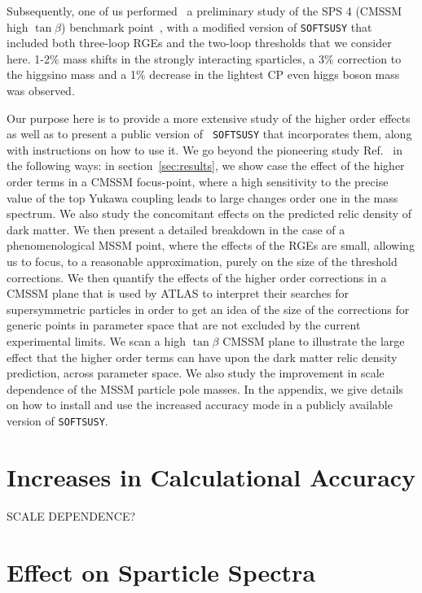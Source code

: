 \documentclass[final,3p,times,pdflatex]{elsarticle}
\begin{document}
Subsequently, one of us performed~\cite{Bednyakov:2010ni} a preliminary study
of the SPS 4 (CMSSM high
$\tan \beta$) benchmark
point~\cite{Allanach:2002nj}, with a modified version of {\tt SOFTSUSY} that
included both three-loop RGEs and the two-loop thresholds that we consider
here. 1-2$\%$ mass shifts in the strongly interacting sparticles, a 3$\%$
correction to the higgsino mass and a 1$\%$ decrease in the lightest CP even
higgs boson mass was observed. 

Our purpose here is to provide a more extensive
study of the higher order effects as well as to present a public version of {\tt
  SOFTSUSY} that incorporates them, along with instructions on how to use it.
We go beyond the pioneering study Ref.~\cite{Bednyakov:2010ni} in the
following ways: in section~\ref{sec:results}, we show case the effect of the
higher order terms in a CMSSM  
focus-point, where a high sensitivity to the precise value of the top Yukawa
coupling leads to large changes order one in the mass spectrum. 
We also study the concomitant effects on the predicted relic density of
dark matter.
We then present a detailed
breakdown in the case of a phenomenological MSSM point, where the effects of
the RGEs are 
small, allowing us to focus, to a reasonable approximation, purely on the size
of the threshold corrections. We then quantify the effects of the higher order
corrections in a CMSSM plane that is used by ATLAS to interpret their searches
for supersymmetric particles in order to get an idea of the size of the
corrections for generic points in parameter space that are not excluded by the
current experimental limits. 
We scan a high $\tan \beta$ CMSSM plane to illustrate the large effect that the
higher order terms can have upon the dark matter relic density prediction,
across parameter space. 
We also study the improvement in scale dependence
of the MSSM particle pole masses.  
In the appendix, we give details on how to install and use the increased
accuracy mode in a publicly available version of {\tt SOFTSUSY}.

\section{Increases in Calculational Accuracy}
SCALE DEPENDENCE?

\section{Effect on Sparticle Spectra \label{sec:results}}
\end{document}
